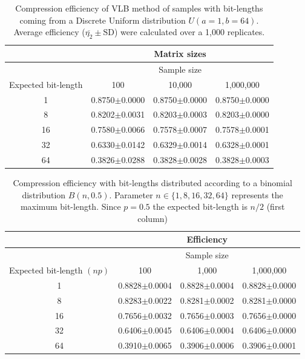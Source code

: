 \documentclass[10pt]{article}
\begin{document}
\begin{table}[h]
  \centering
  \caption{Compression efficiency of VLB method of samples with bit-lengths 
coming from a Discrete Uniform distribution $U(a=1,b=64)$. Average efficiency 
($\overline{\eta_2}\pm\textrm{SD}$) were calculated over a 1,000 replicates.}
 \begin{tabular}{cccc}
    \hline
    & &Matrix sizes& \\
    \hline
    & &Sample size & \\
    Expected bit-length & 100 & 10,000 & 1,000,000 \\
    \hline
     1&0.8750$\pm$0.0000& 0.8750$\pm$0.0000&0.8750$\pm$0.0000\\ 
     8&0.8202$\pm$0.0031& 0.8203$\pm$0.0003&0.8203$\pm$0.0000\\ 
     16&0.7580$\pm$0.0066& 0.7578$\pm$0.0007&0.7578$\pm$0.0001\\ 
     32&0.6330$\pm$0.0142& 0.6329$\pm$0.0014&0.6328$\pm$0.0001\\ 
     64&0.3826$\pm$0.0288& 0.3828$\pm$0.0028&0.3828$\pm$0.0003\\ 
    \hline
 \end{tabular}
 \label{tab:04}
\end{table}

\begin{table}[h]
  \centering
  \caption{Compression efficiency with bit-lengths distributed according to a 
binomial distribution $B(n,0.5)$. Parameter $n \in \{1, 8, 16, 32, 64 \} $ 
represents the maximum bit-length. Since $p=0.5$ the expected bit-length is 
$n/2$ (first column)}
   \begin{tabular}{cccc}
     \hline
     & &Efficiency& \\
     \hline
     & &Sample size& \\
     Expected bit-length $(np)$ &100 &1,000 &1,000,000 \\
     \hline
     1 &0.8828$\pm$0.0004&0.8828$\pm$0.0004&0.8828$\pm$0.0000\\ 
     8 &0.8283$\pm$0.0022&0.8281$\pm$0.0002&0.8281$\pm$0.0000\\ 
     16&0.7656$\pm$0.0032&0.7656$\pm$0.0003&0.7656$\pm$0.0000\\ 
     32&0.6406$\pm$0.0045&0.6406$\pm$0.0004&0.6406$\pm$0.0000\\ 
     64&0.3910$\pm$0.0065&0.3906$\pm$0.0006&0.3906$\pm$0.0001\\
     \hline
  \end{tabular}
  \label{tab:05}
\end{table}
\end{document}
